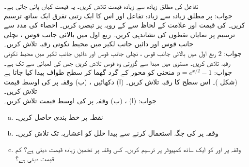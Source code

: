 تفاعل  کی مطلق زیادہ سے زیادہ قیمت تلاش کریں۔ یہ قیمت کہاں پائی جاتی ہے۔\\
جواب:\quad
{} پر مطلق زیادہ سے زیادہ 
تفاعل  اور اس کا ایک رتبی تفرق ایک ساتھ ترسیم کریں۔  کی قیمت اور علامت کے لحاظ سے  کے رویہ پر تبصرہ کریں۔ احصاء کی مدد سے ترسیم پر نمایاں نقطوں کی نشاندہی کریں۔
ربع اول میں بالائی جانب قوس ، نچلی جانب قوس  اور دائیں جانب لکیر  میں محیط تکونی رقبہ تلاش کریں۔ \\
جواب:\quad
$2$
ربع اول میں بالائی جانب قوس ، نچلی جانب قوس  اور دائیں جانب لکیر  میں محیط تکونی رقبہ تلاش کریں۔ 
مستوی  میں مبدا سے گزرتی وہ قوس  تلاش کریں جس کی لمبائی  سے  تک  ہے۔\\
جواب:\quad
$y=e^{x/2}-1$
منحنی  کو محور  کے گرد گھما کر سطح طواف پیدا کیا جاتا ہے (شکل )۔ اس سطح کا رقبہ تلاش کریں۔
(ا) دکھائیں ، (ب) وقفہ  پر  کی اوسط قیمت تلاش کریں۔\\
جواب:\quad
(ا) ، (ب) 
وقفہ  پر  کی اوسط قیمت تلاش کریں۔
\\
\begin{enumerate}[a.]
\item
نقطہ  پر خط بندی  حاصل کریں۔
\item
وقفہ  پر  کی جگہ  استعمال کرنے سے پیدا خلل کو  اعشاریہ تک تلاش کریں۔
\item
وقفہ  پر  اور  کو ایک ساتھ کمپیوٹر پر ترسیم کریں۔ کس وقفہ پر تخمین زیادہ قیمت دیتی ہے؟  کم قیمت دیتی ہے؟
\end{enumerate}
